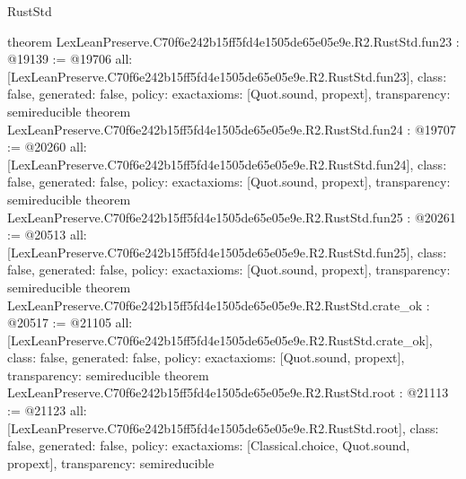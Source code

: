 \begin{lexlean}{RustStd}
\begin{coremodule}
{}
theorem LexLeanPreserve.C70f6e242b15ff5fd4e1505de65e05e9e.R2.RustStd.fun23 : @19139 := @19706 {
  all: [LexLeanPreserve.C70f6e242b15ff5fd4e1505de65e05e9e.R2.RustStd.fun23],
  class: false,
  generated: false,
  policy: exact{axioms: [Quot.sound, propext]},
  transparency: semireducible
}
theorem LexLeanPreserve.C70f6e242b15ff5fd4e1505de65e05e9e.R2.RustStd.fun24 : @19707 := @20260 {
  all: [LexLeanPreserve.C70f6e242b15ff5fd4e1505de65e05e9e.R2.RustStd.fun24],
  class: false,
  generated: false,
  policy: exact{axioms: [Quot.sound, propext]},
  transparency: semireducible
}
theorem LexLeanPreserve.C70f6e242b15ff5fd4e1505de65e05e9e.R2.RustStd.fun25 : @20261 := @20513 {
  all: [LexLeanPreserve.C70f6e242b15ff5fd4e1505de65e05e9e.R2.RustStd.fun25],
  class: false,
  generated: false,
  policy: exact{axioms: [Quot.sound, propext]},
  transparency: semireducible
}
theorem LexLeanPreserve.C70f6e242b15ff5fd4e1505de65e05e9e.R2.RustStd.crate_ok : @20517 := @21105 {
  all: [LexLeanPreserve.C70f6e242b15ff5fd4e1505de65e05e9e.R2.RustStd.crate_ok],
  class: false,
  generated: false,
  policy: exact{axioms: [Quot.sound, propext]},
  transparency: semireducible
}
theorem LexLeanPreserve.C70f6e242b15ff5fd4e1505de65e05e9e.R2.RustStd.root : @21113 := @21123 {
  all: [LexLeanPreserve.C70f6e242b15ff5fd4e1505de65e05e9e.R2.RustStd.root],
  class: false,
  generated: false,
  policy: exact{axioms: [Classical.choice, Quot.sound, propext]},
  transparency: semireducible
}


\end{coremodule}
\end{lexlean}
